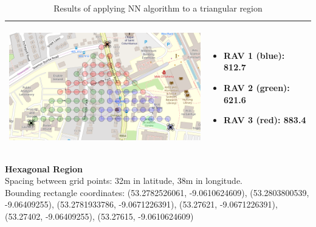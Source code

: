 \begin{table}[h!]
\begin{tabular}{ | c | m{5cm} | }
    \begin{minipage}[c][57mm][c]{.6\textwidth}
      \includegraphics[width=\linewidth, height=55mm]{Chapters/MultiAgentCoverage/MultipleTravellingSalesman/Figs/Triangle/ThreeRAV.PNG}
    \end{minipage}
    &
    \begin{itemize}[leftmargin=*]
    \item[] RAV 1 (blue): 812.7
    \item[] RAV 2 (green): 621.6
    \item[] RAV 3 (red): 883.4
    \end{itemize}
    \\
    \hline
  \end{tabular}
  \caption{Results of applying NN algorithm to a triangular region}\label{table:NNAlgoResultsTri}
\end{table}


\textbf{Hexagonal Region}
\\Spacing between grid points: 32m in latitude, 38m in longitude.
\\Bounding rectangle coordinates: (53.2782526061, -9.0610624609), (53.2803800539, -9.06409255), (53.2781933786, -9.0671226391), (53.27621, -9.0671226391), (53.27402, -9.06409255), (53.27615, -9.0610624609)
\\


